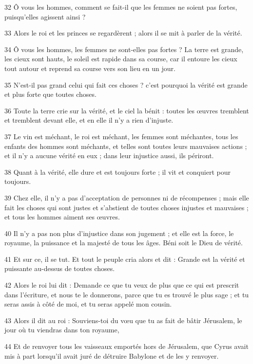 \par 32 Ô vous les hommes, comment se fait-il que les femmes ne soient pas fortes, puisqu'elles agissent ainsi ?
\par 33 Alors le roi et les princes se regardèrent ; alors il se mit à parler de la vérité.
\par 34 Ô vous les hommes, les femmes ne sont-elles pas fortes ? La terre est grande, les cieux sont hauts, le soleil est rapide dans sa course, car il entoure les cieux tout autour et reprend sa course vers son lieu en un jour.
\par 35 N'est-il pas grand celui qui fait ces choses ? c'est pourquoi la vérité est grande et plus forte que toutes choses.
\par 36 Toute la terre crie sur la vérité, et le ciel la bénit : toutes les œuvres tremblent et tremblent devant elle, et en elle il n'y a rien d'injuste.
\par 37 Le vin est méchant, le roi est méchant, les femmes sont méchantes, tous les enfants des hommes sont méchants, et telles sont toutes leurs mauvaises actions ; et il n'y a aucune vérité en eux ; dans leur injustice aussi, ils périront.
\par 38 Quant à la vérité, elle dure et est toujours forte ; il vit et conquiert pour toujours.
\par 39 Chez elle, il n'y a pas d'acceptation de personnes ni de récompenses ; mais elle fait les choses qui sont justes et s'abstient de toutes choses injustes et mauvaises ; et tous les hommes aiment ses œuvres.
\par 40 Il n'y a pas non plus d'injustice dans son jugement ; et elle est la force, le royaume, la puissance et la majesté de tous les âges. Béni soit le Dieu de vérité.
\par 41 Et sur ce, il se tut. Et tout le peuple cria alors et dit : Grande est la vérité et puissante au-dessus de toutes choses.
\par 42 Alors le roi lui dit : Demande ce que tu veux de plus que ce qui est prescrit dans l'écriture, et nous te le donnerons, parce que tu es trouvé le plus sage ; et tu seras assis à côté de moi, et tu seras appelé mon cousin.
\par 43 Alors il dit au roi : Souviens-toi du vœu que tu as fait de bâtir Jérusalem, le jour où tu viendras dans ton royaume,
\par 44 Et de renvoyer tous les vaisseaux emportés hors de Jérusalem, que Cyrus avait mis à part lorsqu'il avait juré de détruire Babylone et de les y renvoyer.
